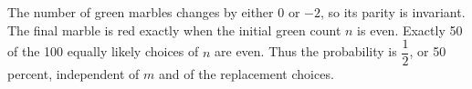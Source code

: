 The number of green marbles changes by either 0 or $-2$, so its parity is invariant. The final marble is red exactly when the initial green count $n$ is even. Exactly 50 of the 100 equally likely choices of $n$ are even. Thus the probability is $\boxed{\dfrac{1}{2}}$, or 50 percent, independent of $m$ and of the replacement choices.
